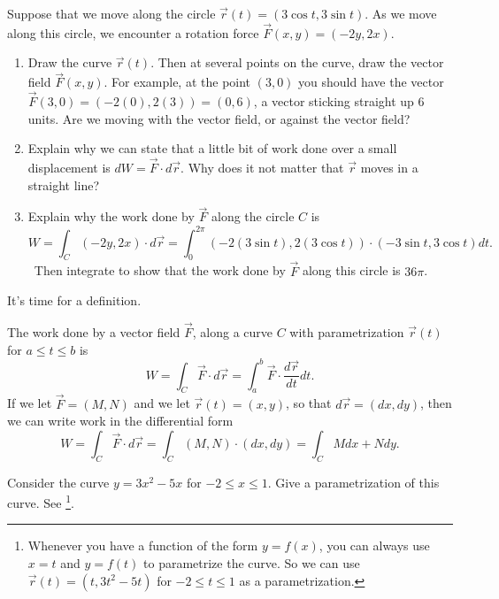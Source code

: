 \begin{problem}
%
 Suppose that we move along the circle $\vec r(t) = (3\cos t,3\sin t)$. As we move along this circle, we encounter a rotation force $\vec F(x,y) = (-2y,2x)$.
\begin{enumerate}
 \item Draw the curve $\vec r(t)$. Then at several points on the curve, draw the vector field $\vec F(x,y)$.  For example, at the point $(3,0)$ you should have the vector $\vec F(3,0)=(-2(0),2(3))=(0,6)$, a vector sticking straight up 6 units. Are we moving with the vector field, or against the vector field?
 \item Explain why we can state that a little bit of work done over a small displacement is $dW = \vec F\cdot d\vec r$. Why does it not matter that $\vec r$ moves in a straight line? 
 \item Explain why the work done by $\vec F$ along the circle $C$ is 
$$W = \int_C\left(-2y,2x\right)\cdot d\vec r
= \int_0^{2\pi}\left(-2(3\sin t),2(3\cos t)\right)\cdot(-3\sin t, 3\cos t)dt.$$\
 Then integrate to show that the work done by $\vec F$ along this circle is $36\pi$.  
\end{enumerate}
 
\end{problem}

It's time for a definition. 
\begin{definition}
The work done by a vector field $\vec F$, along a curve $C$ with parametrization $\vec r(t)$ for $a\leq t\leq b$ is
$$W = \int_C \vec F\cdot d\vec r= \int_a^b \vec F\cdot \frac{d\vec r}{dt}dt.$$
If we let $\vec F = (M,N)$ and we let $\vec r(t)=(x,y)$, so that $d\vec r = (dx,dy)$, 
then we can write work in the differential form 
$$W = \int_C \vec F\cdot d\vec r= \int_C (M,N)\cdot (dx,dy) = \int_C Mdx+Ndy.$$
\end{definition}

\begin{review*}
 Consider the curve $y=3x^2-5x$ for $-2\leq x\leq 1$.  Give a parametrization of this curve. See \footnote{Whenever you have a function of the form $y=f(x)$, you can always use $x=t$ and $y=f(t)$ to parametrize the curve.  So we can use $\vec r(t) = (t, 3t^2-5t)$ for $-2\leq t\leq 1$ as a parametrization.}. 
\end{review*}


